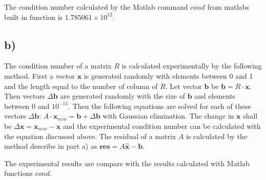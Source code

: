 \documentclass[11pt,a4paper,roman]{scrartcl}
\begin{document}
The condition number calculated by the Matlab command $cond$ from matlabs built in function is $1.785061\times 10^{12}$. 
\subsection*{b)}

The condition number of a matrix $R$ is calculated experimentally by the following method. First a vector $\boldsymbol{x}$ is generated randomly with elements between 0 and 1 and the length equal to the number of column of $R$. Let vector $\boldsymbol{b}$ be $\boldsymbol{b} = R\cdot\boldsymbol{x}$. Then vectors $\Delta \boldsymbol{b}$ are generated randomly with the size of $\boldsymbol{b}$ and elements between $0$ and $10^{-15}$. Then the following equations are solved for each of these vectors $\Delta \boldsymbol{b}$: $A\cdot \boldsymbol{x}_{new} =\boldsymbol{b} + \Delta \boldsymbol{b}$ with Gaussian elimination. The change in $\boldsymbol{x}$ shall be $\Delta \boldsymbol{x} = \boldsymbol{x}_{new} - \boldsymbol{x}$ and the experimental condition number can be calculated with the equation discussed above. The residual of a matrix $A$ is calculated by the method describe in part a) as $\boldsymbol{res} = A \hat{\boldsymbol{x}} - \boldsymbol{b}$. 

The experimental results are compare with the results calculated with Matlab functions $cond$. 
\end{document}
